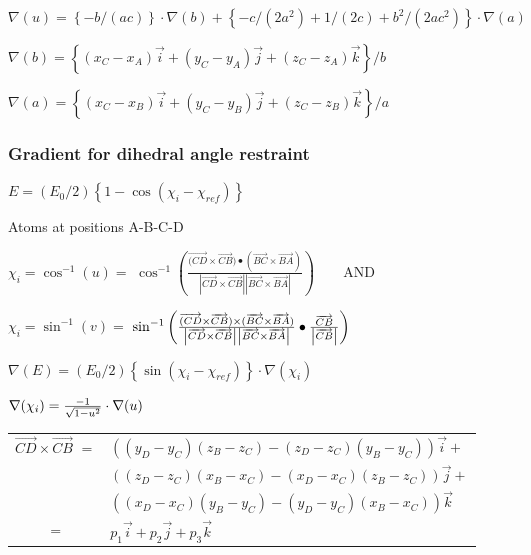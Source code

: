 $\nabla (u)=\left\{ -b/\left( ac\right) \right\} \cdot \nabla (b)+\left\{
-c/\left( 2a^{2}\right) +1/(2c)+b^{2}/\left( 2ac^{2}\right) \right\} \cdot 
\nabla (a)$

$\nabla (b)=\left\{ (x_{C}-x_{A})\overrightarrow{i}+(y_{C}-y_{A})%
\overrightarrow{j}+(z_{C}-z_{A})\overrightarrow{k}\right\} /b$

$\nabla (a)=\left\{ (x_{C}-x_{B})\overrightarrow{i}+(y_{C}-y_{B})%
\overrightarrow{j}+(z_{C}-z_{B})\overrightarrow{k}\right\} /a $

\subsubsection{Gradient for dihedral angle restraint}

$E=(E_{0}/2)\left\{ 1-\cos \left( \chi _{i}-\chi _{ref}\right) \right\} $

Atoms at positions A-B-C-D

$\chi _{i}=\cos ^{-1}(u)=$ $\cos ^{-1}\left( \frac{\overrightarrow{(CD}%
\times \overrightarrow{CB})\bullet (\overrightarrow{BC}\times 
\overrightarrow{BA})}{\left| \overrightarrow{CD}\times \overrightarrow{CB}%
\right| \left| \overrightarrow{BC}\times \overrightarrow{BA}\right| }\right)
\qquad $AND

$\chi _{i}=\sin ^{-1}(v)=$ $\sin ^{-1}\left( \frac{\overrightarrow{(CD}%
\times \overrightarrow{CB})\times (\overrightarrow{BC}\times \overrightarrow{%
BA})}{\left| \overrightarrow{CD}\times \overrightarrow{CB}\right| \left| 
\overrightarrow{BC}\times \overrightarrow{BA}\right| }\bullet \frac{%
\overrightarrow{CB}}{\left| \overrightarrow{CB}\right| }\right) $

$\nabla (E)=(E_{0}/2)\left\{ \sin \left( \chi _{i}-\chi _{ref}\right)
\right\} \cdot \nabla (\chi _{i})$

$\nabla (\chi _{i})=\frac{-1}{\sqrt{1-u^{2}}}\cdot \nabla (u)\smallskip
\medskip $

\begin{tabular}{ll}
$\overrightarrow{CD}\times \overrightarrow{CB}$ $=$ & $%
((y_{D}-y_{C})(z_{B}-z_{C})-(z_{D}-z_{C})(y_{B}-y_{C}))\overrightarrow{i}+$
\\ 
& $((z_{D}-z_{C})(x_{B}-x_{C})-(x_{D}-x_{C})(z_{B}-z_{C}))\overrightarrow{j}+
$ \\ 
& $((x_{D}-x_{C})(y_{B}-y_{C})-(y_{D}-y_{C})(x_{B}-x_{C}))\overrightarrow{k}$
\\ 
\multicolumn{1}{c}{$=$} & $p_{1}\overrightarrow{i}+p_{2}\overrightarrow{j}%
+p_{3}\overrightarrow{k}$%
\end{tabular}
\medskip \medskip 

